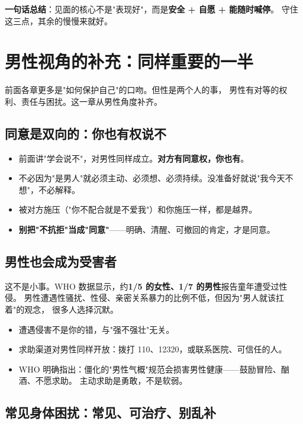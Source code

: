 \documentclass[12pt,UTF8,openany]{ctexbook}
\begin{document}
\noindent\textbf{一句话总结}：见面的核心不是"表现好"，而是\textbf{安全 + 自愿 + 能随时喊停}。
守住这三点，其余的慢慢来就好。

\chapter{男性视角的补充：同样重要的一半}
\label{chap:male}

前面各章更多是"如何保护自己"的口吻。但性是两个人的事，
男性有对等的权利、责任与困扰。这一章从男性角度补齐。

\section{同意是双向的：你也有权说不}

\begin{itemize}[leftmargin=2em]
  \item 前面讲"学会说不"，对男性同样成立。\textbf{对方有同意权，你也有}。
  \item 不必因为"是男人"就必须主动、必须想、必须持续。没准备好就说"我今天不想"，不必解释。
  \item 被对方施压（"你不配合就是不爱我"）和你施压一样，都是越界。
  \item \textbf{别把"不抗拒"当成"同意"}——明确、清醒、可撤回的肯定，才是同意。
\end{itemize}

\section{男性也会成为受害者}

这不是小事。WHO 数据显示，约\textbf{1/5 的女性、1/7 的男性}报告童年遭受过性侵。
男性遭遇性骚扰、性侵、亲密关系暴力的比例不低，但因为"男人就该扛着"的观念，
很多人选择沉默。

\begin{itemize}[leftmargin=2em]
  \item 遭遇侵害不是你的错，与"强不强壮"无关。
  \item 求助渠道对男性同样开放：拨打 110、12320，或联系医院、可信任的人。
  \item WHO 明确指出：僵化的"男性气概"规范会损害男性健康——鼓励冒险、酗酒、不愿求助。
        主动求助是勇敢，不是软弱。
\end{itemize}

\section{常见身体困扰：常见、可治疗、别乱补}
\end{document}
